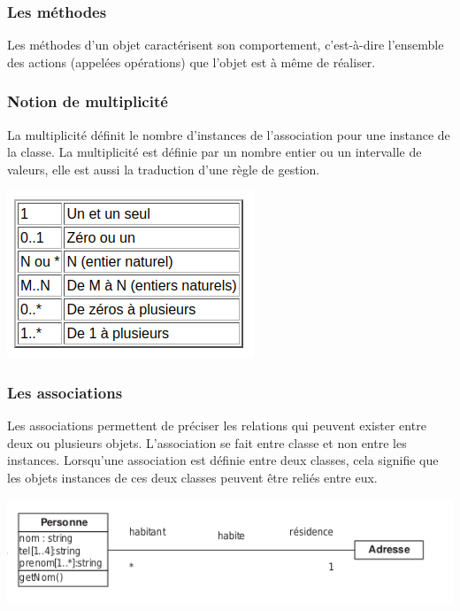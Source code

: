			\subsubsection{Les méthodes}
				Les méthodes d'un objet caractérisent son comportement, c'est-à-dire l'ensemble des actions (appelées opérations) que l'objet est à même de réaliser.
			\subsubsection{Notion de multiplicité}
				La multiplicité définit le nombre d'instances de l'association pour une instance de la classe.
				La multiplicité est définie par un nombre entier ou un intervalle de valeurs, elle est aussi la traduction d'une règle de gestion.
				\begin{center}
					\includegraphics{images/img-2.png}
					\label{figure2}
				\end{center}
			\subsubsection{Les associations}
			Les associations permettent de préciser les relations qui peuvent exister entre deux ou plusieurs objets.
			L'association se fait entre classe et non entre les instances. Lorsqu'une association est
			définie entre deux classes, cela signifie que les objets instances de ces deux classes
			peuvent être reliés entre eux.
			\begin{center}
				\includegraphics[width=\columnwidth]{images/assoc-1.png}
				\label{figure3}
			\end{center}
